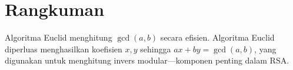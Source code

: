 \section*{Rangkuman}
Algoritma Euclid menghitung $\gcd(a,b)$ secara efisien. Algoritma Euclid diperluas menghasilkan koefisien $x,y$ sehingga $ax+by=\gcd(a,b)$, yang digunakan untuk menghitung invers modular---komponen penting dalam RSA.
